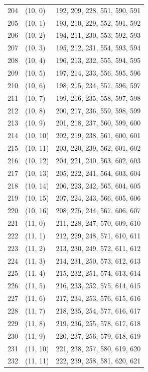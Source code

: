 \documentclass{article}
\begin{document}
\begin{longtable}{lll}
  204 & (10, 0) & 192, 209, 228, 551, 590, 591 \\
  205 & (10, 1) & 193, 210, 229, 552, 591, 592 \\
  206 & (10, 2) & 194, 211, 230, 553, 592, 593 \\
  207 & (10, 3) & 195, 212, 231, 554, 593, 594 \\
  208 & (10, 4) & 196, 213, 232, 555, 594, 595 \\
  209 & (10, 5) & 197, 214, 233, 556, 595, 596 \\
  210 & (10, 6) & 198, 215, 234, 557, 596, 597 \\
  211 & (10, 7) & 199, 216, 235, 558, 597, 598 \\
  212 & (10, 8) & 200, 217, 236, 559, 598, 599 \\
  213 & (10, 9) & 201, 218, 237, 560, 599, 600 \\
  214 & (10, 10) & 202, 219, 238, 561, 600, 601 \\
  215 & (10, 11) & 203, 220, 239, 562, 601, 602 \\
  216 & (10, 12) & 204, 221, 240, 563, 602, 603 \\
  217 & (10, 13) & 205, 222, 241, 564, 603, 604 \\
  218 & (10, 14) & 206, 223, 242, 565, 604, 605 \\
  219 & (10, 15) & 207, 224, 243, 566, 605, 606 \\
  220 & (10, 16) & 208, 225, 244, 567, 606, 607 \\
  221 & (11, 0) & 211, 228, 247, 570, 609, 610 \\
  222 & (11, 1) & 212, 229, 248, 571, 610, 611 \\
  223 & (11, 2) & 213, 230, 249, 572, 611, 612 \\
  224 & (11, 3) & 214, 231, 250, 573, 612, 613 \\
  225 & (11, 4) & 215, 232, 251, 574, 613, 614 \\
  226 & (11, 5) & 216, 233, 252, 575, 614, 615 \\
  227 & (11, 6) & 217, 234, 253, 576, 615, 616 \\
  228 & (11, 7) & 218, 235, 254, 577, 616, 617 \\
  229 & (11, 8) & 219, 236, 255, 578, 617, 618 \\
  230 & (11, 9) & 220, 237, 256, 579, 618, 619 \\
  231 & (11, 10) & 221, 238, 257, 580, 619, 620 \\
  232 & (11, 11) & 222, 239, 258, 581, 620, 621 \\

\end{longtable}
\end{document}

